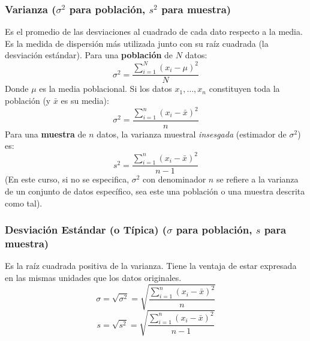 \documentclass[12pt, letterpaper]{article}
\begin{document}
\subsubsection{\texorpdfstring{Varianza ($\sigma^2$ para población, $s^2$ para muestra)}{Varianza (sigma-cuadrado para población, s-cuadrado para muestra)}}
Es el promedio de las desviaciones al cuadrado de cada dato respecto a la media. Es la medida de dispersión más utilizada junto con su raíz cuadrada (la desviación estándar).
Para una \textbf{población} de $N$ datos:
\[ \sigma^2 = \frac{\sum_{i=1}^{N} (x_i - \mu)^2}{N} \]
Donde $\mu$ es la media poblacional. Si los datos $x_1, \dots, x_n$ constituyen toda la población (y $\bar{x}$ es su media):
\[ \sigma^2 = \frac{\sum_{i=1}^{n} (x_i - \bar{x})^2}{n} \]
Para una \textbf{muestra} de $n$ datos, la varianza muestral \textit{insesgada} (estimador de $\sigma^2$) es:
\[ s^2 = \frac{\sum_{i=1}^{n} (x_i - \bar{x})^2}{n-1} \]
(En este curso, si no se especifica, $\sigma^2$ con denominador $n$ se refiere a la varianza de un conjunto de datos específico, sea este una población o una muestra descrita como tal).

\subsubsection{\texorpdfstring{Desviación Estándar (o Típica) ($\sigma$ para población, $s$ para muestra)}{Desviación Estándar (o Típica) (sigma para población, s para muestra)}}
Es la raíz cuadrada positiva de la varianza. Tiene la ventaja de estar expresada en las mismas unidades que los datos originales.
\[ \sigma = \sqrt{\sigma^2} = \sqrt{\frac{\sum_{i=1}^{n} (x_i - \bar{x})^2}{n}} \]
\[ s = \sqrt{s^2} = \sqrt{\frac{\sum_{i=1}^{n} (x_i - \bar{x})^2}{n-1}} \]
\end{document}
